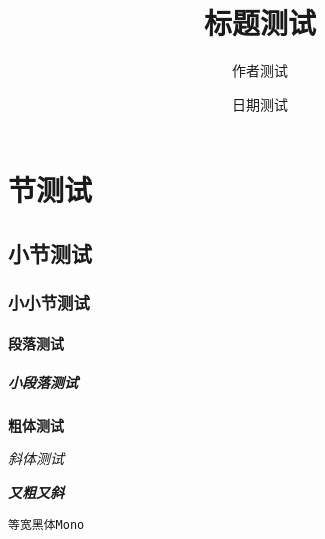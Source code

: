 \documentclass{ctexart}
\title{标题测试}
\author{作者测试}
\date{日期测试}
\begin{document}
\maketitle
\section{节测试}
\subsection{小节测试}
\subsubsection{小小节测试}
\paragraph{段落测试}
\subparagraph{小段落测试}

\textbf{粗体测试}

\textit{斜体测试}

\textit{\textbf{又粗又斜}}

\texttt{等宽黑体Mono}
\end{document}
